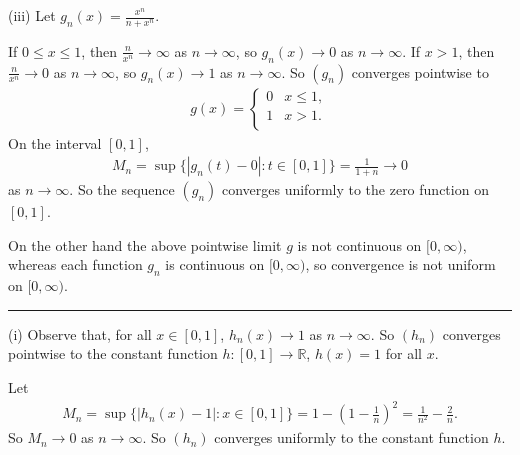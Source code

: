 \documentclass[letterpaper,10pt,english]{jupyterBook}
\begin{document}
\sphinxAtStartPar
(iii) Let \(\displaystyle g_n(x) =  \frac{x^n}{n+x^n}\).

\sphinxAtStartPar
If \(0\leq x\leq 1\), then \(\frac{n}{x^n} \rightarrow \infty\) as \(n\rightarrow \infty\), so \(g_n(x)\rightarrow 0\) as \(n\rightarrow \infty\). If \(x>1\), then \(\frac{n}{x^n} \rightarrow 0\) as \(n\rightarrow \infty\), so \(g_n(x)\rightarrow 1\) as \(n\rightarrow \infty\). So \((g_n)\) converges pointwise to
\begin{equation*}
\begin{split}
g (x) =  \left\{ \begin{array}{ll}
0 & x\leq 1, \\
1 & x>1. \\
\end{array} \right.
\end{split}
\end{equation*}
\sphinxAtStartPar
On the interval \([0,1]\),
\begin{equation*}
\begin{split}
M_n = \sup \{ |g_n(t) -0 | : t\in [0,1] \}  = \frac{1}{1+n} \rightarrow 0
\end{split}
\end{equation*}
\sphinxAtStartPar
as \(n\rightarrow \infty\). So the sequence \((g_n)\) converges uniformly to the zero function on \([0,1]\).

On the other hand the above pointwise limit \(g\) is not continuous on \([0,\infty )\), whereas each function \(g_n\) is continuous on \([0,\infty )\), so convergence is not uniform on \([0,\infty )\).


\bigskip\hrule\bigskip


\sphinxAtStartPar
{\hyperref[\detokenize{Problems:id57}]{}}
(i) Observe that, for all \(x\in[0,1]\), \(h_n(x)\rightarrow 1\) as \(n\rightarrow \infty\).
So \((h_n)\) converges pointwise to the constant function \(h:[0,1]\to\mathbb{R}\), \(h(x)=1\) for all \(x\).

\sphinxAtStartPar
Let
\begin{equation*}
\begin{split}
M_n = \sup \{ |h_n(x)-1| : x\in [0,1] \} = 1 - \left(1-\frac{1}{n}\right)^2 =\frac{1}{n^2}-\frac{2}{n}.
\end{split}
\end{equation*}
\sphinxAtStartPar
So \(M_n\rightarrow 0\) as \(n\rightarrow \infty\). So \((h_n)\) converges uniformly to the constant function \(h\).
\end{document}
